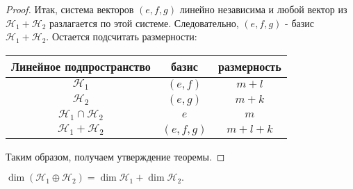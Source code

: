 \begin{proof}
    Итак, система векторов $(e, f, g)$ линейно независима и любой вектор из $\mathcal{H}_1 + \mathcal{H}_2$ разлагается по этой системе. Следовательно, $(e, f, g)$ - базис $\mathcal{H}_1 + \mathcal{H}_2$. Остается подсчитать размерности:
    
    \begin{table}[H]
        \centering
        \begin{tabular}{|c|c|c|}
            \hline
            Линейное подпространство & базис & размерность\\
            \hline
            $\mathcal{H}_1$ & $(e, f)$ & $m + l$\\
            \hline
            $\mathcal{H}_2$ & $(e, g)$ & $m + k$\\
            \hline
            $\mathcal{H}_1 \cap \mathcal{H}_2$ & $e$ & $m$\\
            \hline
            $\mathcal{H}_1 + \mathcal{H}_2$ & $(e, f, g)$ & $m + l + k$\\
            \hline
        \end{tabular}
        \label{tab:my_label}
    \end{table}
    Таким образом, получаем утверждение теоремы.
\end{proof}

\begin{corollary}
    $\dim(\mathcal{H}_1 \oplus \mathcal{H}_2) = \dim \mathcal{H}_1 + \dim \mathcal{H}_2.$
    \label{cor:corollary_4_6}
\end{corollary}

